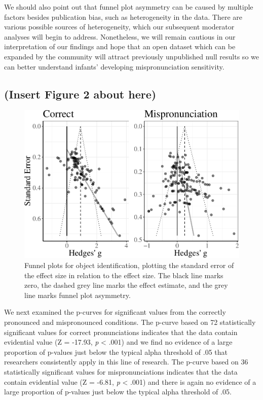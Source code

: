 \documentclass[man]{apa6}
\theoremstyle{definition}
\theoremstyle{definition}
\theoremstyle{definition}
\theoremstyle{remark}
\begin{document}
We should also point out that funnel plot asymmetry can be caused by
multiple factors besides publication bias, such as heterogeneity in the
data. There are various possible sources of heterogeneity, which our
subsequent moderator analyses will begin to address. Nonetheless, we
will remain cautious in our interpretation of our findings and hope that
an open dataset which can be expanded by the community will attract
previously unpublished null results so we can better understand infants'
developing mispronunciation sensitivity.

\subsection{(Insert Figure 2 about
here)}\label{insert-figure-2-about-here}

\begin{figure}
\centering
\includegraphics{Paper_Analyses_files/figure-latex/FunnelCombo-1.pdf}
\caption{\label{fig:FunnelCombo}Funnel plots for object identification,
plotting the standard error of the effect size in relation to the effect
size. The black line marks zero, the dashed grey line marks the effect
estimate, and the grey line marks funnel plot asymmetry.}
\end{figure}

We next examined the p-curves for significant values from the correctly
pronounced and mispronounced conditions. The p-curve based on 72
statistically significant values for correct pronunciations indicates
that the data contain evidential value (Z = -17.93, \emph{p} \textless{}
.001) and we find no evidence of a large proportion of p-values just
below the typical alpha threshold of .05 that researchers consistently
apply in this line of research. The p-curve based on 36 statistically
significant values for mispronunciations indicates that the data contain
evidential value (Z = -6.81, \emph{p} \textless{} .001) and there is
again no evidence of a large proportion of p-values just below the
typical alpha threshold of .05.
\end{document}
